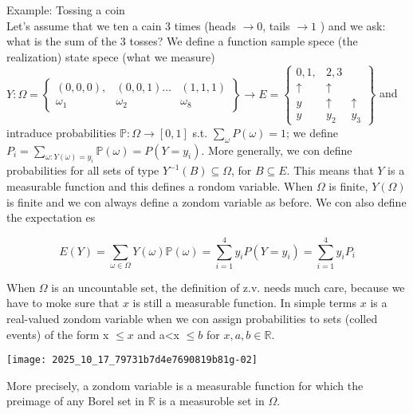 Example: Tossing a coin\\
Let's assume that we ten a cain 3 times (heads $\rightarrow 0$, tails $\rightarrow 1$ ) and we ask: what is the sum of the 3 tosses? We define a function sample spece (the realization) state spece (what we measure)
$Y: \Omega=\left\{\begin{array}{ccc}(0,0,0), & (0,0,1) \ldots & (1,1,1) \\ \omega_{1} & \omega_{2} & \omega_{8}\end{array}\right\} \longrightarrow E=\left\{\begin{array}{ccc}0,1, & 2,3 \\ \uparrow & \uparrow \\ y & \uparrow & \uparrow \\ y & y_{2} & y_{3}\end{array}\right\}$
and intraduce probabilities $\mathbb{P}: \Omega \rightarrow[0,1]$ s.t. $\sum_{\omega} P(\omega)=1$; we define $P_{i}=\sum_{\omega: Y(\omega)=y_{i}} \mathbb{P}(\omega)=P\left(Y=y_{i}\right)$. More generally, we con define probabilities
for all sets of type $Y^{-1}(B) \subseteq \Omega$, for $B \subseteq E$. This means that $Y$ is a measurable function and this defines a rondom variable.
When $\Omega$ is finite, $Y(\Omega)$ is finite and we con always define a zondom variable as before. We con also define the expectation es

$$ E(Y)=\sum_{\omega \in \Omega} Y(\omega) \mathbb{P}(\omega)=\sum_{i=1}^{4} y_{i} P\left(Y=y_{i}\right)=\sum_{i=1}^{4} y_{i} P_{i} $$

When $\Omega$ is an uncountable set, the definition of z.v. needs much care, because we have to moke sure that $x$ is still a measurable function. In simple terms $x$ is a real-valued zondom variable when we con assign probabilities to sets (colled events) of the form {x $\leq x$} and {a<x $\leq b$} for $x, a, b \in \mathbb{R}$.
\begin{center}
\texttt{[image: 2025\_10\_17\_79731b7d4e7690819b81g-02]}
\end{center}

More precisely, a zondom variable is a measurable function for which the preimage of any Borel set in $\mathbb{R}$ is a measuroble set in $\Omega$.

